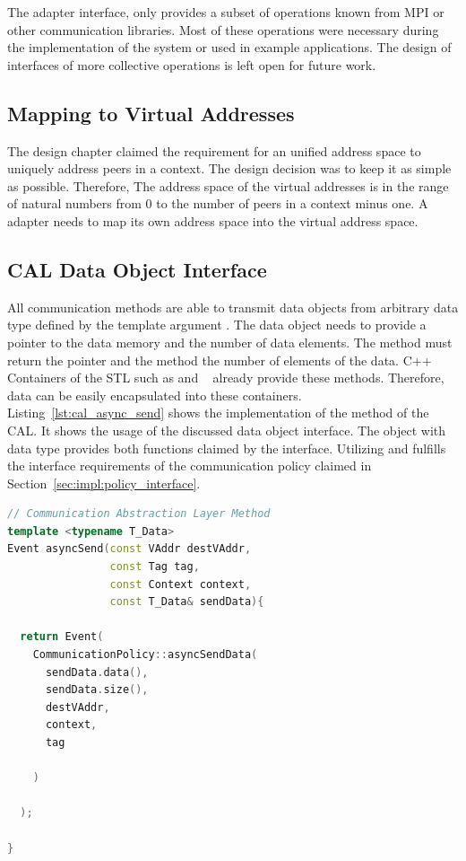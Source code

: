 \noindent The adapter interface, only provides a subset
of operations known from MPI or other communication libraries.  Most
of these operations were necessary during the implementation of the
system or used in example applications. The design of interfaces of
more collective operations is left open for future work.


\subsection{Mapping to Virtual Addresses}
The design chapter claimed the requirement for an unified address
space to uniquely address peers in a context. The design decision was
to keep it as simple as possible. Therefore, The address space of the
virtual addresses is in the range of natural numbers from 0 to the
number of peers in a context minus one. A adapter needs to map its
own address space into the virtual address space.

\subsection{CAL Data Object Interface}
All communication methods are able to transmit data objects from
arbitrary data type defined by the template argument . The
data object needs to provide a pointer to the data memory and the
number of data elements.  The method  must return the
pointer and the method  the number of elements of the
data. C++ Containers of the STL such as  and
~\cite{ref:vector, ref:array} already provide these
methods. Therefore, data can be easily encapsulated into these
containers. Listing~\ref{lst:cal_async_send} shows the implementation of
the  method of the CAL. It shows the usage of the
discussed data object interface.  The object  with data
type  provides both functions claimed by the
interface. Utilizing  and 
fulfills the interface requirements of the communication policy
claimed in Section~\ref{sec:impl:policy_interface}.

\begin{lstlisting}[language=C++, breaklines=false, label={lst:cal_async_send}]
// Communication Abstraction Layer Method
template <typename T_Data>
Event asyncSend(const VAddr destVAddr, 
                const Tag tag, 
                const Context context, 
                const T_Data& sendData){

  return Event(
    CommunicationPolicy::asyncSendData(
      sendData.data(),
      sendData.size(), 
      destVAddr, 
      context, 
      tag
      
    )
      
  );

}
\end{lstlisting}

